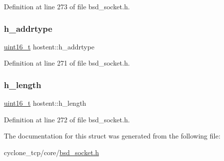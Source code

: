 Definition at line 273 of file bsd\+\_\+socket.\+h.

\mbox{\label{structhostent_ac50b1b1166869d7d33fb283bc0cc366e}} 
\subsubsection{\texorpdfstring{h\+\_\+addrtype}{h\_addrtype}}
{\footnotesize\ttfamily \hyperlink{stdint_8h_a273cf69d639a59973b6019625df33e30}{uint16\+\_\+t} hostent\+::h\+\_\+addrtype}



Definition at line 271 of file bsd\+\_\+socket.\+h.

\mbox{\label{structhostent_a541d2f4b6fc636f6afe7373229dfc541}} 
\subsubsection{\texorpdfstring{h\+\_\+length}{h\_length}}
{\footnotesize\ttfamily \hyperlink{stdint_8h_a273cf69d639a59973b6019625df33e30}{uint16\+\_\+t} hostent\+::h\+\_\+length}



Definition at line 272 of file bsd\+\_\+socket.\+h.



The documentation for this struct was generated from the following file\+:\begin{DoxyCompactItemize}
\item 
cyclone\+\_\+tcp/core/\hyperlink{bsd__socket_8h}{bsd\+\_\+socket.\+h}\end{DoxyCompactItemize}

